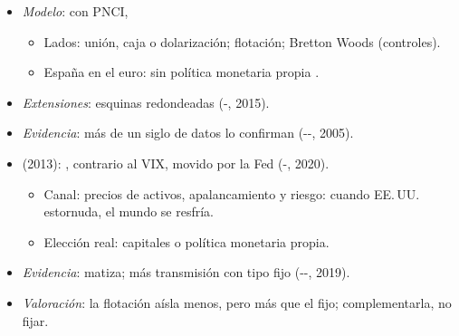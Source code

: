 \documentclass{article}
\begin{document}
\begin{columnas}
\begin{itemize}
  \begin{itemize}
  \item No se puede nadar y guardar la ropa; regla de .
  \end{itemize}
\item \emph{Modelo}: con PNCI,
  \begin{itemize}
  \item Lados: unión, caja o dolarización; flotación; Bretton Woods (controles).
  \item España en el euro: sin política monetaria propia .
  \end{itemize}
\end{itemize}
\begin{itemize}
\item \emph{Extensiones}: esquinas redondeadas (-, 2015).
\item \emph{Evidencia}: más de un siglo de datos lo confirman (--, 2005).
\end{itemize}
\begin{itemize}
\item {} (2013): , contrario al VIX, movido por la Fed (-, 2020).
  \begin{itemize}
  \item Canal: precios de activos, apalancamiento y riesgo: cuando EE.\,UU. estornuda, el mundo se resfría.
  \item Elección real: capitales o política monetaria propia.
  \end{itemize}
\item \emph{Evidencia}: matiza; más transmisión con tipo fijo (--, 2019).
\item \emph{Valoración}: la flotación aísla menos, pero más que el fijo; complementarla, no fijar.
\end{itemize}


\end{columnas}
\end{document}
